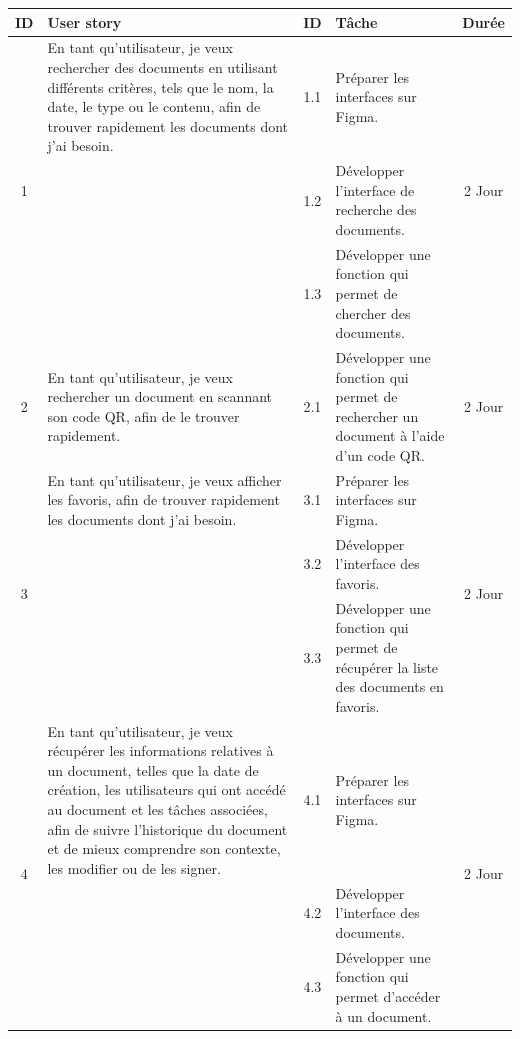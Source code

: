 \begin{adjustwidth}{-1cm}{}
    
    \begin{longtable}{|c|p{6cm}|c|p{6cm}|c|}
      \hline
      \textbf{ID} & \textbf{User story} & \textbf{ID}  & \textbf{Tâche} & \textbf{Durée} \\
      \hline
      \multirow{3}{*}{1} & En tant qu'utilisateur, je veux rechercher des documents en utilisant différents critères, tels que le nom, la date, le type ou le contenu, afin de trouver rapidement les documents dont j'ai besoin. & 1.1 & Préparer les interfaces sur Figma. & \multirow{3}{*}{2 Jour} \\
      \cline{3-4}
      & & 1.2 & Développer l'interface de recherche des documents. & \\
      \cline{3-4}
      & & 1.3 & Développer une fonction qui permet de chercher des documents. & \\
      \cline{1-5}
      2 & En tant qu'utilisateur, je veux rechercher un document en scannant son code QR, afin de le trouver rapidement. & 2.1 & Développer une fonction qui permet de rechercher un document à l'aide d'un code QR. & 2 Jour \\
      \cline{1-5}
      \multirow{3}{*}{3} & En tant qu'utilisateur, je veux afficher les favoris, afin de trouver rapidement les documents dont j'ai besoin.  & 3.1 & Préparer les interfaces sur Figma. & \multirow{3}{*}{2 Jour} \\
      \cline{3-4}
      & & 3.2 & Développer l'interface des favoris. & \\
      \cline{3-4}
      & & 3.3 & Développer une fonction qui permet de récupérer la liste des documents en favoris. & \\
      \cline{1-5}
      \multirow{4}{*}{4} & En tant qu'utilisateur, je veux récupérer les informations relatives à un document, telles que la date de création, les utilisateurs qui ont accédé au document et les tâches associées, afin de suivre l'historique du document et de mieux comprendre son contexte, les modifier ou de les signer. & 4.1 & Préparer les interfaces sur Figma. & \multirow{3}{*}{2 Jour} \\
      \cline{3-4}
      & & 4.2 & Développer l'interface des documents. & \\
      \cline{3-4}
      & & 4.3 & Développer une fonction qui permet d'accéder à un document. & \\

\end{longtable}
\end{adjustwidth}
